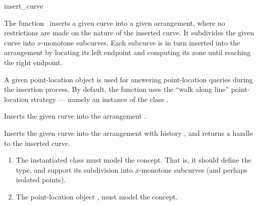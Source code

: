 \ccRefPageBegin

\begin{ccRefFunction}{insert_curve}

\ccDefinition

The function \ccRefName\ inserts a given curve into a given arrangement,
where no restrictions are made on the nature of the inserted curve.
It subdivides the given curve into $x$-monotone subcurves. Each subcurve
is in turn inserted into the arrangement by locating its left endpoint
and computing its zone until reaching the right endpoint.

A given point-location object is used for answering point-location queries
during the insertion process. By default, the function uses the
``walk along line'' point-location strategy --- namely an instance of the
class .



Inserts the given curve  into the arrangement .




Inserts the given curve  into the arrangement with history
, and returns a handle to the inserted curve.

\begin{enumerate}
\item The instantiated  class must model the
   concept. That is, it should define the
   type, and support its subdivision into $x$-monotone
  subcurves (and perhaps isolated points).
\item The point-location object , must model the
 concept.
\end{enumerate}

\end{ccRefFunction}

\ccRefPageEnd
